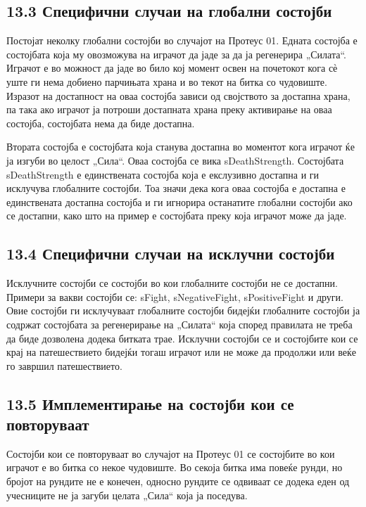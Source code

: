 \subsection{13.3 Специфични случаи на глобални состојби}

Постојат неколку глобални состојби во случајот на Протеус 01. Едната состојба е состојбата која му овозможува на играчот да јаде за да ја регенерира „Силата“. Играчот е во можност да јаде во било кој момент освен на почетокот кога сѐ уште ги нема добиено парчињата храна и во текот на битка со чудовиште. Изразот на достапност на оваа состојба зависи од својството за достапна храна, па така ако играчот ја потроши достапната храна преку активирање на оваа состојба, состојбата нема да биде достапна.

Втората состојба е состојбата која станува достапна во моментот кога играчот ќе ја изгуби во целост „Сила“. Оваа состојба се вика sDeathStrength. Состојбата sDeathStrength е единствената состојба која е екслузивно достапна и ги исклучува глобалните состојби. Тоа значи дека кога оваа состојба е достапна е единствената достапна состојба и ги игнорира останатите глобални состојби ако се достапни, како што на пример е состојбата преку која играчот може да јаде.

\subsection{13.4 Специфични случаи на исклучни состојби}

Исклучните состојби се состојби во кои глобалните состојби не се достапни. Примери за вакви состојби се: sFight, sNegativeFight, sPositiveFight и други. Овие состојби ги исклучуваат глобалните состојби бидејќи глобалните состојби ја содржат состојбата за регенерирање на „Силата“ која според правилата не треба да биде дозволена додека битката трае. Исклучни состојби се и состојбите кои се крај на патешествието бидејќи тогаш играчот или не може да продолжи или веќе го завршил патешествието.

\subsection{13.5 Имплементирање на состојби кои се повторуваат}

Состојби кои се повторуваат во случајот на Протеус 01 се состојбите во кои играчот е во битка со некое чудовиште. Во секоја битка има повеќе рунди, но бројот на рундите не е конечен, односно рундите се одвиваат се додека еден од учесниците не ја загуби целата „Сила“ која ја поседува.


